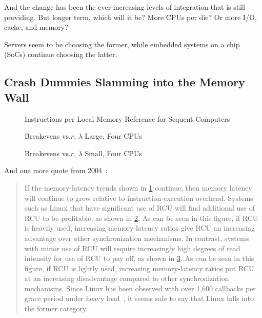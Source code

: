 And the change has been the ever-increasing levels of integration
that  is still providing.
But longer term, which will it be?
More CPUs per die?
Or more I/O, cache, and memory?

Servers seem to be choosing the former, while embedded systems on a chip
(SoCs) continue choosing the latter.

\subsection{Crash Dummies Slamming into the Memory Wall}
\label{sec:future:Crash Dummies Slamming into the Memory Wall}

\begin{figure}
\centering
\epsfxsize=3in
\caption{Instructions per Local Memory Reference for Sequent Computers}
\label{fig:future:Instructions per Local Memory Reference for Sequent Computers}
\end{figure}

\begin{figure}
\centering
\epsfxsize=3in
\caption{Breakevens vs.\@ $r$, $\lambda$ Large, Four CPUs}
\label{fig:future:Breakevens vs. r; lambda Large; Four CPUs}
\end{figure}

\begin{figure}
\centering
\epsfxsize=3in
\caption{Breakevens vs.\@ $r$, $\lambda$ Small, Four CPUs}
\label{fig:future:Breakevens vs. r; Worst-Case lambda; Four CPUs}
\end{figure}

And one more quote from 2004~\cite{PaulEdwardMcKenneyPhD}:

\begin{quote}
	If the memory-latency trends shown in
	\cref{fig:future:Instructions per Local Memory Reference for Sequent Computers}
	continue, then memory latency will continue to grow relative
	to instruction-execution overhead.
	Systems such as Linux that have significant use of RCU will find
	additional use of RCU to be profitable, as shown in
	\cref{fig:future:Breakevens vs. r; lambda Large; Four CPUs}.
	As can be seen in this figure, if RCU is heavily used, increasing
	memory-latency ratios give RCU an increasing advantage over other
	synchronization mechanisms.
	In contrast, systems with minor
	use of RCU will require increasingly high degrees of read intensity
	for use of RCU to pay off, as shown in
	\cref{fig:future:Breakevens vs. r; Worst-Case lambda; Four CPUs}.
	As can be seen in this figure, if RCU is lightly used,
	increasing memory-latency ratios
	put RCU at an increasing disadvantage compared to other synchronization
	mechanisms.
	Since Linux has been observed with over 1,600 callbacks per grace
	period under heavy load~\cite{Sarma04c},
	it seems safe to say that Linux falls into the former category.
\end{quote}

